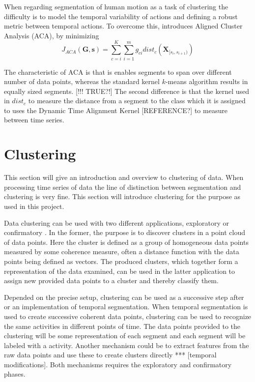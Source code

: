 When regarding segmentation of human motion as a task of clustering the
difficulty is to model the temporal variability of actions
and defining a robust metric between temporal actions. To overcome this,
\cite{zhou2008aligned} introduces Aligned Cluster Analysis (ACA), by minimizing
\begin{equation} \label{eq:ACA}
J_{\mathit{ACA}}(\mathbf{G},\mathbf{s}) =
\sum_{c=i}^{K} \sum_{i=1}^{m} g_{ci} \mathit{dist}_c
(\mathbf{X}_{[s_i,s_{i+1})})
\end{equation}

The characteristic of ACA is that is enables segments to span over different
number of data points, whereas the standard kernel $k$-means algorithm results
in equally sized segments. [!!! TRUE?!] The second difference is that the
kernel used in $\mathit{dist}_c$ to measure the distance from a segment to the
class which it is assigned to uses the Dynamic Time Alignment Kernel
[REFERENCE?] to measure between time series.


\section{Clustering}

This section will give an introduction and overview to clustering of data.
When processing time series of data the line of distinction between
segmentation and clustering is very fine. This section will introduce
clustering for the purpose as used in this project.

Data clustering can be used with two different applications, exploratory or
confirmatory \cite{jain1999data}. In the former, the purpose is to discover
clusters in a point cloud of data points. Here the cluster is defined as a
group of homogeneous data points measured by some coherence measure, often a
distance function with the data points being defined as vectors. The produced
clusters, which together form a representation of the data examined, can be
used in the
latter application to assign new provided data points to a cluster and thereby
classify them.

Depended on the precise setup, clustering can be used as a successive step
after or an implementation of temporal segmentation. When temporal
segmentation is used to create successive coherent data points, clustering can
be used to recognize the same activities in different points of time. The data
points provided to the clustering will be some representation of each segment
and each segment will be labeled with a activity. Another mechanism could be
to extract features from the raw data points and use these to create clusters
directly *** [temporal modifications]. Both mechanisms requires the
exploratory and confirmatory phases.

